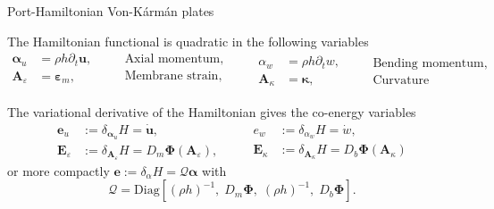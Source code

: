 \documentclass[aspectratio=169]{beamer}
\begin{document}
\begin{frame}{Port-Hamiltonian Von-K\'arm\'an plates}
	
\begin{tcolorbox}[width=0.95\textwidth, nobeforeafter, colframe=theme,title=Energy variables]
The Hamiltonian functional is quadratic in the following variables
\begin{equation*}
	\begin{aligned}
		\bm{\alpha}_u &= \rho h \partial_t \bm{u},\\
		\bm{A}_\varepsilon &= \bm{\varepsilon}_m, \\
	\end{aligned} \quad
	\begin{aligned}
		&\text{Axial momentum},\\
		&\text{Membrane strain}, \\
	\end{aligned} \qquad
	\begin{aligned}
		\alpha_w &= \rho h \partial_t{w}, \\
		\bm{A}_\kappa &= \bm{\kappa},
	\end{aligned}\quad
	\begin{aligned}
		&\text{Bending momentum}, \\
		&\text{Curvature}
	\end{aligned}
\end{equation*}
\end{tcolorbox}
\vspace{.3cm}
\begin{tcolorbox}[width=0.95\textwidth, nobeforeafter, colframe=theme,title=Co-energy variables]
The variational derivative of the Hamiltonian gives the co-energy variables
\begin{equation*}
	\begin{aligned}
		\bm{e}_u &:= \delta_{\bm\alpha_u} H = \dot{\bm{u}},\\
		\bm{E}_\varepsilon &:= \delta_{\bm{A}_\varepsilon} H = D_m \bm{\Phi}(\bm{A}_\varepsilon),
	\end{aligned} \qquad
	\begin{aligned}
		{e}_w &:= \delta_{\alpha_w} H = \dot{w}, \\
		\bm{E}_\kappa &:= \delta_{\bm{A}_\kappa} H = D_b\bm{\Phi}(\bm{A}_\kappa)
	\end{aligned}
\end{equation*}
or more compactly $\bm{e} := \delta_\alpha H = \mathcal{Q} \bm{\alpha}$ with
\begin{equation*}
	\mathcal{Q} = \mathrm{Diag}\left[(\rho h)^{-1}, \; D_m \bm{\Phi}, \; (\rho h)^{-1}, \; D_b \bm{\Phi}\right].
\end{equation*}
\end{tcolorbox}


\end{frame}
\end{document}
